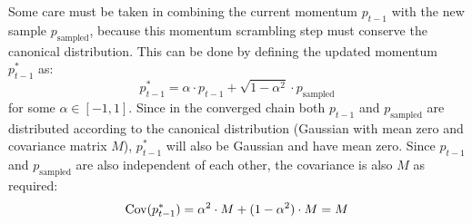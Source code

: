 Some care must be taken in combining the current momentum $p_{t-1}$ with the new sample $p_\textrm{sampled}$, because this momentum scrambling step must conserve the canonical distribution. This can be done by defining the updated momentum $p^*_{t-1}$ as:
\begin{equation} \label{eq:partialMomentumUpdate}
p^*_{t-1} = \alpha \cdot p_{t-1} + \sqrt{1 - \alpha ^2} \cdot p_\textrm{sampled}
\end{equation}
for some $\alpha \in [-1, 1]$. Since in the converged chain both $p_{t-1}$ and $p_\textrm{sampled}$ are distributed according to the canonical distribution (Gaussian with mean zero and covariance matrix $M$), $p^*_{t-1}$ will also be Gaussian and have mean zero. Since $p_{t-1}$ and $p_\textrm{sampled}$ are also independent of each other, the covariance is also $M$ as required:
\begin{equation}
\mathrm{Cov}(p^*_{t-1}) = \alpha^2 \cdot M + (1 - \alpha ^2) \cdot M = M
\end{equation}

